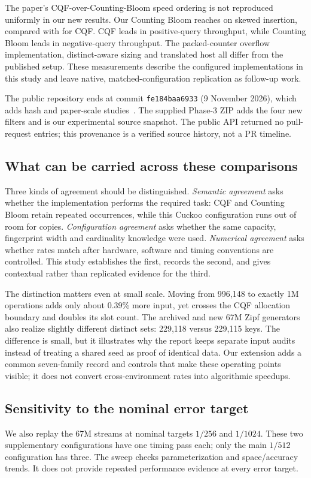 The paper's CQF-over-Counting-Bloom speed ordering is not reproduced uniformly in our new results. Our Counting Bloom reaches \CountingBloomInsertSkewLarge{}\Mops{} on skewed insertion, compared with \CqfInsertSkewLarge{}\Mops{} for CQF. CQF leads in positive-query throughput, while Counting Bloom leads in negative-query throughput. The packed-counter overflow implementation, distinct-aware sizing and translated host all differ from the published setup. These measurements describe the configured implementations in this study and leave native, matched-configuration replication as follow-up work.

The public repository ends at commit \texttt{fe184baa6933} (9 November 2026), which adds hash and paper-scale studies~\cite{projectcode}. The supplied Phase-3 ZIP adds the four new filters and is our experimental source snapshot. The public API returned no pull-request entries; this provenance is a verified source history, not a PR timeline.

\subsection{What can be carried across these comparisons}
Three kinds of agreement should be distinguished. \textit{Semantic agreement} asks whether the implementation performs the required task: CQF and Counting Bloom retain repeated occurrences, while this Cuckoo configuration runs out of room for copies. \textit{Configuration agreement} asks whether the same capacity, fingerprint width and cardinality knowledge were used. \textit{Numerical agreement} asks whether rates match after hardware, software and timing conventions are controlled. This study establishes the first, records the second, and gives contextual rather than replicated evidence for the third.

The distinction matters even at small scale. Moving from 996,148 to exactly 1M operations adds only about 0.39\% more input, yet crosses the CQF allocation boundary and doubles its slot count. The archived and new 67M Zipf generators also realize slightly different distinct sets: 229,118 versus 229,115 keys. The difference is small, but it illustrates why the report keeps separate input audits instead of treating a shared seed as proof of identical data. Our extension adds a common seven-family record and controls that make these operating points visible; it does not convert cross-environment rates into algorithmic speedups.
\clearpage

\subsection{Sensitivity to the nominal error target}
We also replay the 67M streams at nominal targets $1/256$ and $1/1024$. These two supplementary configurations have one timing pass each; only the main $1/512$ configuration has three. The sweep checks parameterization and space/accuracy trends. It does not provide repeated performance evidence at every error target.


